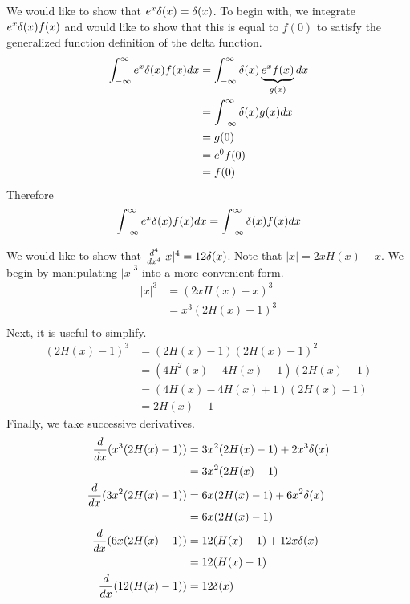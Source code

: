 \begin{example}
    We would like to show that \(e^x\delta(x)=\delta(x)\). To begin with, we integrate \(e^x\delta(x)f(x)\) and would like to show that this is equal to \(f(0)\) to satisfy the generalized function definition of the delta function.
    \begin{equation}
        \begin{split}
            \int_{-\infty}^{\infty} e^x\delta(x)f(x)dx &= \int_{-\infty}^{\infty} \delta(x)\underbrace{e^xf(x)}_{g(x)}dx\\
            &=\int_{-\infty}^{\infty} \delta(x)g(x)dx\\
            &=g(0)\\
            &=e^0f(0)\\
            &=f(0)\\
        \end{split}
    \end{equation}
    Therefore
    \begin{equation}
        \int_{-\infty}^{\infty} e^x\delta(x)f(x)dx = \int_{-\infty}^{\infty} \delta(x)f(x)dx
    \end{equation}
\end{example}
\begin{example}
    We would like to show that \(\frac{d^4}{dx^4}|x|^4 = 12\delta(x)\). Note that \(|x|=2xH(x)-x\). We begin by manipulating \(|x|^3\) into a more convenient form.
    \begin{equation}
        \begin{split}
            |x|^3 &= (2xH(x)-x)^3\\
            &=x^3(2H(x)-1)^3\\
        \end{split}
    \end{equation}
    Next, it is useful to simplify.
    \begin{equation}
        \begin{split}
            (2H(x)-1)^3 &= (2H(x)-1)(2H(x)-1)^2\\
            &=(4H^2(x)-4H(x)+1)(2H(x)-1)\\
            &=(4H(x)-4H(x)+1)(2H(x)-1)\\
            &=2H(x)-1
        \end{split}
    \end{equation}
    Finally, we take successive derivatives.
    \begin{equation}
        \begin{split}
            \frac{d}{dx}(x^3(2H(x)-1)) &= 3x^2(2H(x)-1) +2x^3\delta(x)\\
            &=3x^2(2H(x)-1)\\
            \frac{d}{dx}(3x^2(2H(x)-1)) &= 6x(2H(x)-1) + 6x^2\delta(x)\\
            &=6x(2H(x)-1)\\
            \frac{d}{dx}(6x(2H(x)-1)) &= 12(H(x)-1) + 12x\delta(x)\\
            &= 12(H(x)-1)\\
            \frac{d}{dx}(12(H(x)-1)) &= 12\delta(x)
        \end{split}
    \end{equation}
\end{example}